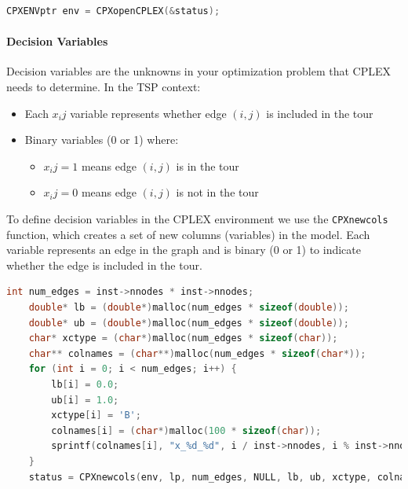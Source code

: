 \documentclass{article}
\begin{document}
\begin{lstlisting}[language=C]
	CPXENVptr env = CPXopenCPLEX(&status);
\end{lstlisting}


\paragraph{Decision Variables}
Decision variables are the unknowns in your optimization problem that CPLEX needs to determine. In the TSP context: 
\begin{itemize}
	\item Each $x_ij$ variable represents whether edge $(i,j)$ is included in the tour
	\item Binary variables (0 or 1) where:
	\begin{itemize}
		\item $x_ij = 1$ means edge $(i,j)$ is in the tour
		\item $x_ij = 0$ means edge $(i,j)$ is not in the tour
	\end{itemize}
\end{itemize}

To define decision variables in the CPLEX environment we use the \texttt{CPXnewcols} function, which creates a set of new columns (variables) in the model.
Each variable represents an edge in the graph and is binary (0 or 1) to indicate whether the edge is included in the tour.
\begin{lstlisting}[language=C, caption={CPLEX API - CPXnewcols}]
	int num_edges = inst->nnodes * inst->nnodes;
	double* lb = (double*)malloc(num_edges * sizeof(double));
	double* ub = (double*)malloc(num_edges * sizeof(double));
	char* xctype = (char*)malloc(num_edges * sizeof(char));
	char** colnames = (char**)malloc(num_edges * sizeof(char*));
	for (int i = 0; i < num_edges; i++) {
		lb[i] = 0.0;
		ub[i] = 1.0;
		xctype[i] = 'B';
		colnames[i] = (char*)malloc(100 * sizeof(char));
		sprintf(colnames[i], "x_%d_%d", i / inst->nnodes, i % inst->nnodes);
	}
	status = CPXnewcols(env, lp, num_edges, NULL, lb, ub, xctype, colnames);
	
\end{lstlisting}
\end{document}
